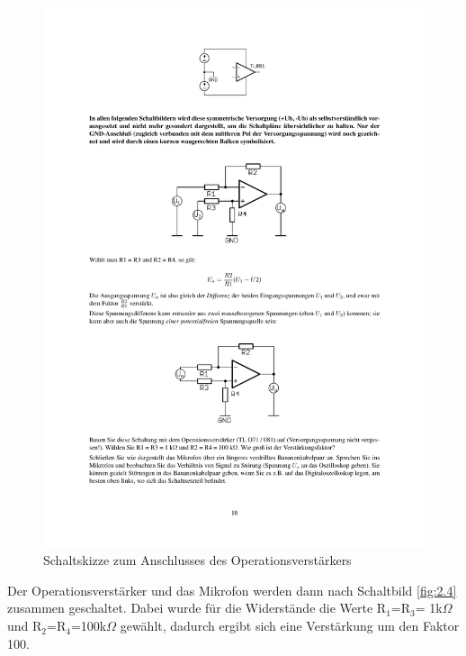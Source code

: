 \documentclass[12pt,a4paper]{article}
\begin{document}
\begin{figure}[H] 
  \centering
    \includegraphics[trim = 10mm 240mm 10mm 15mm, clip, scale = 1]{Op-Amp.pdf}
  	\caption[Schaltskizze zum Anschlusses des Operationsverstärkers]{Schaltskizze zum Anschlusses des Operationsverstärkers\footnotemark}
  \label{fig:2.33}
\end{figure}

Der Operationsverstärker und das Mikrofon werden dann nach Schaltbild \ref{fig:2.4} zusammen geschaltet.
Dabei wurde für die Widerstände die Werte R$_1$=R$_3$= 1k$\Omega$ und R$_2$=R$_4$=100k$\Omega$ gewählt, dadurch ergibt sich eine Verstärkung um den Faktor 100.
\end{document}
